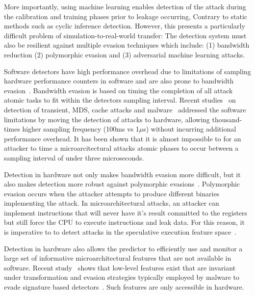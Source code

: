 More importantly, using machine learning enables detection of the attack during the calibration and training phases prior to leakage occurring, Contrary to static methods such as cyclic inference detection.  
However, this presents a particularly difficult
problem of simulation-to-real-world transfer: %
The detection system must also be resilient against multiple evasion techniques which include: (1) bandwidth reduction (2) polymorphic evasion and (3) adversarial machine learning attacks.   

 
Software detectors have high performance overhead due to limitations of sampling hardware performance counters in software and are also prone to bandwidth evasion~\cite{Gaudiot2020, PerSpectron}. Bandwidth evasion is based on timing the completion of all attack atomic 
tasks to fit within the detectors sampling interval. Recent studies~\cite{PerSpectron, cyclone2019} on detection of transient, MDS, cache attacks and malware~\cite{Malware2015, ensembleRaid2015,kazdagli-16,RHMD2017} addressed the software limitations by moving the detection of
attacks to hardware, allowing thousand-times higher sampling frequency (100ms vs 1$\mu$s) without incurring additional performance overhead. It has been shown that it is almost impossible to for an attacker to time a microarcitectural attacks atomic phases to occur between a sampling interval of under three microseconds. %

Detection in hardware not only makes bandwidth evasion more difficult, but it also makes detection more robust against polymorphic evasions~\cite{PerSpectron, cyclone2019, RHMD2017}. Polymorphic evasion occurs when the attacker attempts to produce different binaries implementing the attack. In microarchitectural attacks, an attacker can implement instructions that will never have it’s result committed to the registers but still force the CPU to execute instructions and leak data.  For this reason, it is imperative to to detect attacks in the speculative execution feature 
space~\cite{wampler-19, PerSpectron}. 



Detection in hardware also allows the predictor to efficiently use and monitor a large set of informative microarchitectural features that are not available in software. Recent study~\cite{PerSpectron} shows that low-level features exist that are invariant under transformation and evasion strategies typically employed by malware to evade signature based detectors~\cite{PaulKocher,paulKocherSpectreAttacks}. Such features are only accessible in hardware. 

